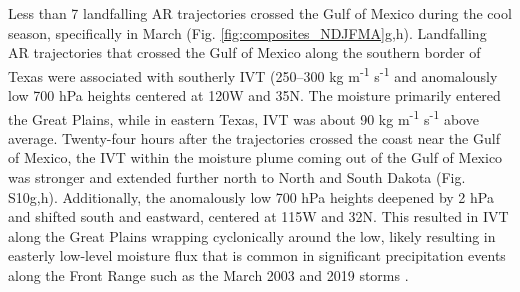 \documentclass[draft]{agujournal2019}
\begin{document}
Less than 7 landfalling AR trajectories crossed the Gulf of Mexico during the cool season, specifically in March (Fig. \ref{fig:composites_NDJFMA}g,h). Landfalling AR trajectories that crossed the Gulf of Mexico along the southern border of Texas were associated with southerly IVT (250--300 kg m\textsuperscript{-1} s\textsuperscript{-1} and anomalously low 700 hPa heights centered at 120\textdegree W and 35\textdegree N. The moisture primarily entered the Great Plains, while in eastern Texas, IVT was about 90 kg m\textsuperscript{-1} s\textsuperscript{-1} above average. Twenty-four hours after the trajectories crossed the coast near the Gulf of Mexico, the IVT within the moisture plume coming out of the Gulf of Mexico was stronger and extended further north to North and South Dakota (Fig. S10g,h). Additionally, the anomalously low 700 hPa heights deepened by 2 hPa and shifted south and eastward, centered at 115\textdegree W and 32\textdegree N. This resulted in IVT along the Great Plains wrapping cyclonically around the low, likely resulting in easterly low-level moisture flux that is common in significant precipitation events along the Front Range such as the March 2003 and 2019 storms \cite{Wesley2013Extreme2003, Zou2025A2019}.

\end{document}
